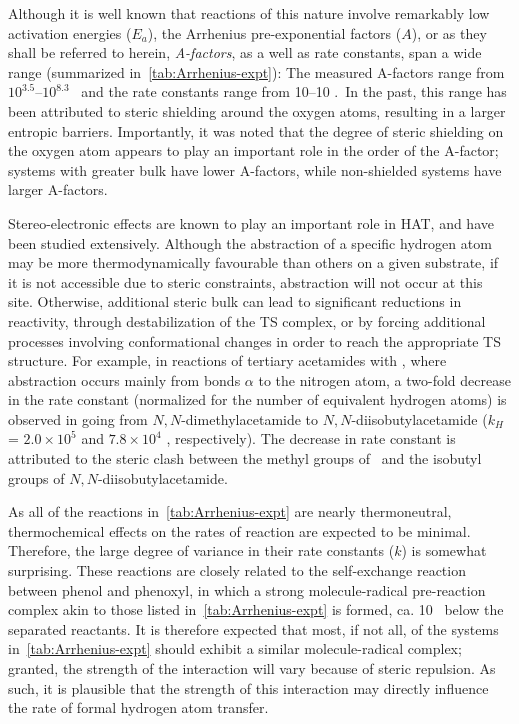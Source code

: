 \begin{doublespace}
Although it is well known that reactions of this nature involve remarkably low
activation energies ($E_a$),\cite{Lucarini1996, Mahoney1970a, Mahoney1975,
Korcek1972} the Arrhenius pre-exponential factors ($A$), or as they shall be
referred to herein, \emph{A-factors}, as a well as rate constants, span a wide
range (summarized in~\ref{tab:Arrhenius-expt}): The measured A-factors range
from $10^{3.5}$--$10^{8.3}$ \Ms\ and the rate constants range from 10--10
\Ms.\ In the past, this range has been attributed to steric shielding around the
oxygen atoms, resulting in a larger entropic barriers.\cite{DiLabio2005}
Importantly, it was noted that the degree of steric shielding on the oxygen atom
appears to play an important role in the order of the A-factor; systems with
greater bulk have lower A-factors, while non-shielded systems have larger
A-factors.

Stereo-electronic effects are known to play an important role in HAT, and have
been studied extensively.\cite{Finn2004, Salamone2011, Pischel2001, Griller1981,
Bietti2011, Salamone2012, Malatesta1982, Salamone2014} Although the abstraction
of a specific hydrogen atom may be more thermodynamically favourable than others
on a given substrate, if it is not accessible due to steric constraints,
abstraction will not occur at this site. Otherwise, additional steric bulk can
lead to significant reductions in reactivity, through destabilization of the TS
complex, or by forcing additional processes involving conformational changes in
order to reach the appropriate TS structure. For example, in reactions of
tertiary acetamides with \cumo,\cite{Salamone2014} where abstraction occurs
mainly from  bonds $\alpha$ to the nitrogen atom, a two-fold decrease in
the rate constant (normalized for the number of equivalent hydrogen atoms) is
observed in going from $N,N$-dimethylacetamide to $N,N$-diisobutylacetamide
($k_H$ = $2.0 \times 10^5$ and $7.8 \times 10^4$ \Ms, respectively). The
decrease in rate constant is attributed to the steric clash between the methyl
groups of \cumo\ and the isobutyl groups of $N,N$-diisobutylacetamide.

As all of the reactions in~\ref{tab:Arrhenius-expt} are nearly thermoneutral,
thermochemical effects on the rates of reaction are expected to be minimal.
Therefore, the large degree of variance in their rate constants ($k$) is
somewhat surprising. These reactions are closely related to the self-exchange
reaction between phenol and phenoxyl,\cite{Mayer2002} in which a strong
molecule-radical pre-reaction complex akin to those listed
in~\ref{tab:Arrhenius-expt} is formed, ca. 10 \kcalmol\ below the separated
reactants. It is therefore expected that most, if not all, of the systems
in~\ref{tab:Arrhenius-expt} should exhibit a similar molecule-radical complex;
granted, the strength of the interaction will vary because of steric repulsion.
As such, it is plausible that the strength of this interaction may directly
influence the rate of formal hydrogen atom transfer.


\end{doublespace}
